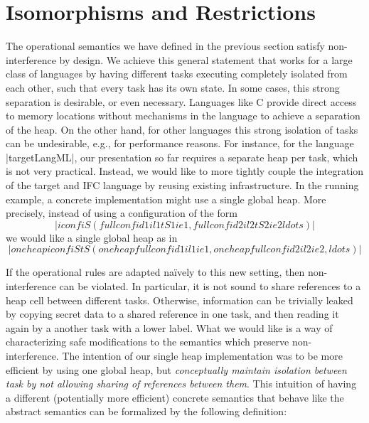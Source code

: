 \section{Isomorphisms and Restrictions}
\label{sec:concrete}

\newcommand{\con}[1]{\ensuremath{{\color{red} #1}}}
\newcommand{\abs}[1]{\ensuremath{{\color{blue} #1}}}

The operational semantics we have defined in the previous section
satisfy non-interference by design.
We achieve this general statement that works for a large class of
languages by having different tasks executing completely isolated from
each other, such that every task has its own state.
In some cases, this strong separation is desirable, or even necessary.
Languages like C provide direct access to memory locations without
mechanisms in the language to achieve a separation of the heap.
On the other hand, for other languages this
strong isolation of tasks can be
undesirable, e.g., for performance reasons.
For instance, for the language |targetLangML|, our presentation so far
requires a separate heap per task, which is not very practical.
Instead, we would like to
more tightly couple the integration of the target and IFC
language by reusing existing infrastructure.  In the running example,
a concrete implementation might use a single global heap.
More precisely, instead of using a configuration of the form
\[|iconf iS (fullconf id1 il1 tS1 ie1, fullconf id2 il2 tS2 ie2 ldots)|\]
we would like a single global heap as in
\[|oneheapiconf iS tS (oneheapfullconf id1 il1 ie1, oneheapfullconf id2 il2 ie2, ldots)|\]

If the operational rules are adapted na\"ively to this new setting,
then non-interference can be violated.  In particular, it is not
sound to share references to a heap cell between different tasks.
Otherwise, information can be trivially leaked by copying
secret data to a shared reference in one task, and then
reading it again by a another task with a lower label.
What we would like is a way of characterizing safe modifications to
the semantics which preserve non-interference.
The intention of our single heap implementation was to be more efficient
by using one global heap, but \emph{conceptually maintain isolation between
task by not allowing sharing of references between them}.
This intuition of having a different (potentially more efficient)
concrete semantics that behave like the abstract semantics
can be formalized by the following definition:


